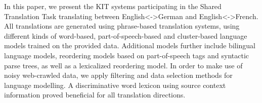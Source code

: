 In this paper, we present the KIT systems participating in the Shared Translation Task translating between English<->German and English<->French. All translations are generated using phrase-based translation systems, using different kinds of word-based, part-of-speech-based and cluster-based language models trained on the provided data. Additional models further include bilingual language models, reordering models based on part-of-speech tags and syntactic parse trees, as well as a lexicalized reordering model. In order to make use of noisy web-crawled data, we apply filtering and data selection methods for language modelling. A discriminative word lexicon using source context information proved beneficial for all translation directions.
